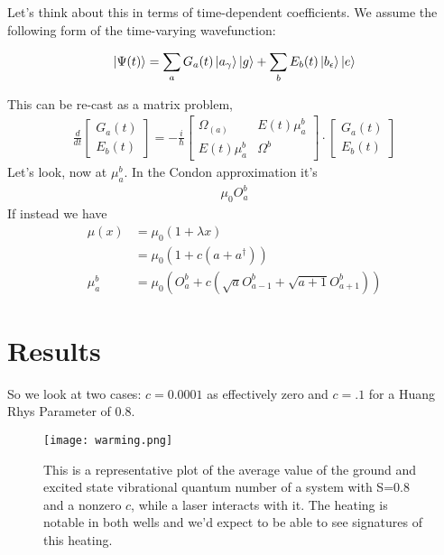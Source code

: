 Let's think about this in terms of time-dependent coefficients.  We assume the following form of the time-varying wavefunction:

\begin{align*}
	\ket{\Psi(t)} = \sum_{a} G_a(t) \ket{a_{\gamma}} \ket{g}  + \sum_{b} E_b(t) \ket{b_{\epsilon}} \ket{e}
\end{align*}

This can be re-cast as a matrix problem,
\begin{align*}
	\frac{d}{dt}\begin{bmatrix}
		G_a(t) \\
		E_b(t)
	\end{bmatrix}
	= -\frac{i}{\hbar}
	\begin{bmatrix}
		\Omega_{(a)} & E(t) \mu_{a}^{b} \\
		E(t) \mu_{a}^{b} & \Omega^{b}
	\end{bmatrix}
	\cdot
	\begin{bmatrix}
		G_a(t) \\
		E_b(t)
	\end{bmatrix}
\end{align*}
Let's look, now at $\mu_{a}^{b}$.  In the Condon approximation it's
\begin{align*}
	\mu_0 O_{a}^{b}
\end{align*}
If instead we have
\begin{align*}
	\mu(x) &= \mu_0 \left(1 + \lambda x \right) \\
	&= \mu_0 \left(1 + c\left(a + a^{\dagger} \right) \right) \\
	\mu_{a}^{b} &= \mu_0\left(O_{a}^{b}  + c\left(\sqrt{a}O_{a-1}^{b} + \sqrt{a+1}O_{a+1}^{b}\right) \right)
\end{align*}


\section{Results}

So we look at two cases: $c=0.0001$ as effectively zero and $c=.1$ for a Huang Rhys Parameter of 0.8.

\begin{figure}
   \texttt{[image: warming.png]}
   \caption{This is a representative plot of the average value of the ground and excited state vibrational quantum number of a system with S=0.8 and a nonzero $c$, while a laser interacts with it.   The heating is notable in both wells and we'd expect to be able to see signatures of this heating.}
	\label{fig:groundHeating}
\end{figure}

